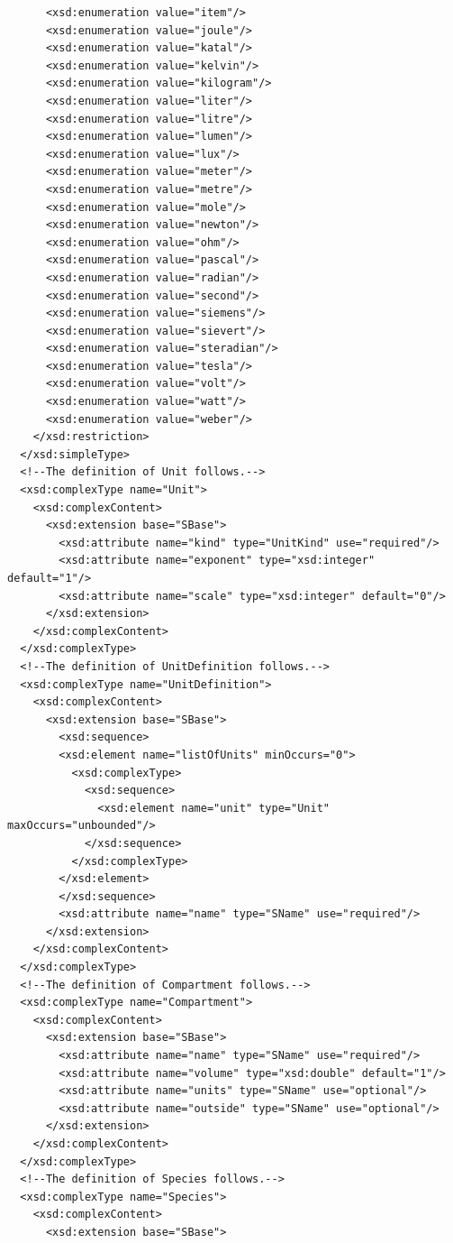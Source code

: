 \documentclass[10pt]{cekarticle}
\newenvironment{blockChanged}{\color{BrickRed}}{}
\begin{document}
\begin{blockChanged}
\begin{small}
\begin{verbatim}
      <xsd:enumeration value="item"/>
      <xsd:enumeration value="joule"/>
      <xsd:enumeration value="katal"/>
      <xsd:enumeration value="kelvin"/>
      <xsd:enumeration value="kilogram"/>
      <xsd:enumeration value="liter"/>
      <xsd:enumeration value="litre"/>
      <xsd:enumeration value="lumen"/>
      <xsd:enumeration value="lux"/>
      <xsd:enumeration value="meter"/>
      <xsd:enumeration value="metre"/>
      <xsd:enumeration value="mole"/>
      <xsd:enumeration value="newton"/>
      <xsd:enumeration value="ohm"/>
      <xsd:enumeration value="pascal"/>
      <xsd:enumeration value="radian"/>
      <xsd:enumeration value="second"/>
      <xsd:enumeration value="siemens"/>
      <xsd:enumeration value="sievert"/>
      <xsd:enumeration value="steradian"/>
      <xsd:enumeration value="tesla"/>
      <xsd:enumeration value="volt"/>
      <xsd:enumeration value="watt"/>
      <xsd:enumeration value="weber"/>
    </xsd:restriction>
  </xsd:simpleType>
  <!--The definition of Unit follows.-->
  <xsd:complexType name="Unit">
    <xsd:complexContent>
      <xsd:extension base="SBase">
      	<xsd:attribute name="kind" type="UnitKind" use="required"/>
      	<xsd:attribute name="exponent" type="xsd:integer" default="1"/>
      	<xsd:attribute name="scale" type="xsd:integer" default="0"/>
      </xsd:extension>
    </xsd:complexContent>
  </xsd:complexType>
  <!--The definition of UnitDefinition follows.-->
  <xsd:complexType name="UnitDefinition">
    <xsd:complexContent>
      <xsd:extension base="SBase">
      	<xsd:sequence>
        <xsd:element name="listOfUnits" minOccurs="0">
          <xsd:complexType>
            <xsd:sequence>
              <xsd:element name="unit" type="Unit" maxOccurs="unbounded"/>
            </xsd:sequence>
          </xsd:complexType>
        </xsd:element>
      	</xsd:sequence>
      	<xsd:attribute name="name" type="SName" use="required"/>
      </xsd:extension>
    </xsd:complexContent>
  </xsd:complexType>
  <!--The definition of Compartment follows.-->
  <xsd:complexType name="Compartment">
    <xsd:complexContent>
      <xsd:extension base="SBase">
      	<xsd:attribute name="name" type="SName" use="required"/>
      	<xsd:attribute name="volume" type="xsd:double" default="1"/>
      	<xsd:attribute name="units" type="SName" use="optional"/>
      	<xsd:attribute name="outside" type="SName" use="optional"/>
      </xsd:extension>
    </xsd:complexContent>
  </xsd:complexType>
  <!--The definition of Species follows.-->
  <xsd:complexType name="Species">
    <xsd:complexContent>
      <xsd:extension base="SBase">

\end{verbatim}
\end{small}
\end{blockChanged}
\end{document}
